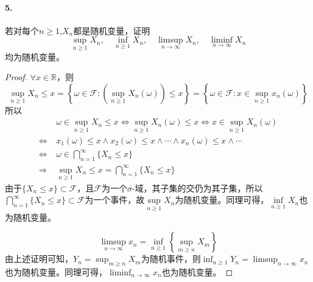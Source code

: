 \documentclass[12pt, a4paper, oneside]{ctexart}
\begin{document}
\paragraph{5.}若对每个$n\geqslant 1$,$X_n$都是随机变量，证明
\begin{equation*}
    \sup_{n\geqslant 1}X_n,\quad \inf_{n\geqslant 1}X_n,\quad \limsup_{n\rightarrow\infty}X_n,\quad \liminf_{n\rightarrow\infty}X_n
\end{equation*}
均为随机变量。
\begin{proof}
    $\forall x\in \mathbb{R}$，则
    \begin{equation*}
        \sup_{n\geqslant 1}X_n\leqslant x = \left\{\omega \in \mathscr{F}:\left(\sup_{n\geqslant1}X_n(\omega)\right)\leqslant x\right\} = \left\{\omega\in\mathscr{F}:x\in \sup_{n\geqslant 1}x_n(\omega)\right\}
    \end{equation*}
    所以
    \begin{equation*}
        \begin{aligned}
            &\ \omega\in\sup_{n\geqslant 1}X_n\leqslant x\iff \sup_{n\geqslant 1}X_n(\omega)\leqslant x\iff x\in \sup_{n\geqslant 1}X_n(\omega)\\
            \iff&\ x_1(\omega)\leqslant x\land x_2(\omega)\leqslant x\land\cdots\land x_n(\omega)\leqslant x\land\cdots\\
            \iff&\ \omega\in\bigcap_{n=1}^{\infty}\{X_n\leqslant x\}\\
            \Rightarrow&\ \sup_{n\geqslant 1}X_n\leqslant x  = \bigcap_{n=1}^{\infty}\{X_n\leqslant x\}
        \end{aligned}
    \end{equation*}
    由于$\{X_n\leqslant x\}\subset \mathscr{F}$，且$\mathscr{F}$为一个$\sigma$-域，其子集的交仍为其子集，所以$\bigcap\limits_{n=1}^\infty \{X_n\leqslant x\}\subset \mathscr{F}$为一个事件，故$\sup\limits_{n\geqslant 1}X_n$为随机变量。同理可得，$\inf\limits_{n\geqslant 1}X_n$也为随机变量。

    \begin{equation*}
        \limsup_{n\rightarrow\infty}x_n=\inf_{n\geqslant 1}\left\{\sup_{m\geqslant n}X_m\right\}
    \end{equation*}
    由上述证明可知，$Y_n=\displaystyle\sup_{m\geqslant n}X_m$为随机事件，则$\displaystyle\inf_{n\geqslant 1}Y_n=\limsup_{n\rightarrow\infty}x_n$也为随机变量。同理可得，$\displaystyle\liminf_{n\rightarrow\infty}x_n$也为随机变量。
\end{proof}
\end{document}
